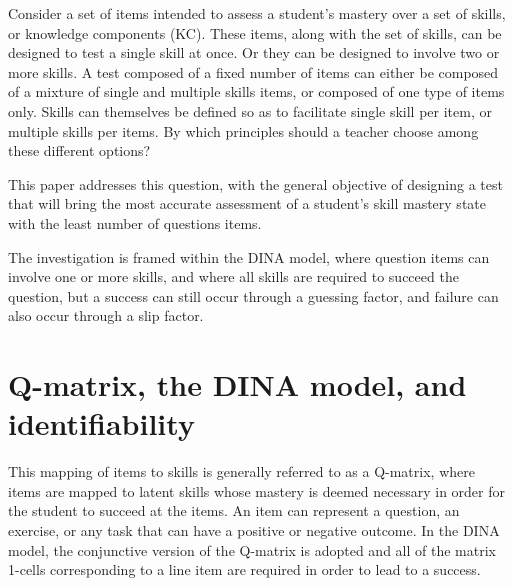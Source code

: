 \documentclass{edm_template}
\begin{document}
Consider a set of items intended to assess a student's mastery over a set of skills, or knowledge components (KC).  These items, along with the set of skills, can be designed to test a single skill at once.  Or they can be designed to involve two or more skills.  A test composed of a fixed number of items can either be composed of a mixture of single and multiple skills items, or composed of one type of items only.  Skills can themselves be defined so as to facilitate single skill per item, or multiple skills per items.  By which principles should a teacher choose among these different options?

This paper addresses this question, with the general objective of designing a test that will bring the most accurate assessment of a student's skill mastery state with the least number of questions items.  

The investigation is framed within the DINA model, where question items can involve one or more skills, and where all skills are required to succeed the question, but a success can still occur through a guessing factor, and failure can also occur through a slip factor.  


\section{Q-matrix, the DINA model, and identifiability}

This mapping of items to skills is generally referred to as a Q-matrix, where items are mapped to latent skills whose mastery is deemed necessary in order for the student to succeed at the items.  An item can represent a question, an exercise, or any task that can have a positive or negative outcome.  In the DINA model, the conjunctive version of the Q-matrix is adopted and all of the matrix 1-cells corresponding to a line item are required in order to lead to a success.  
\end{document}
